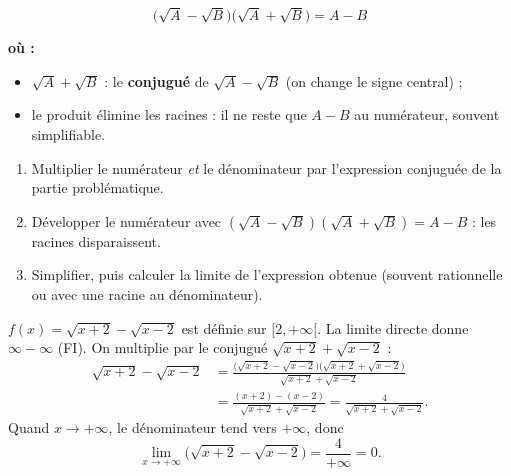 \documentclass[11pt,a4paper]{article}
\newenvironment{ou}{%
  \par\smallskip\noindent\textbf{où :}\nopagebreak
  \begin{itemize}[leftmargin=1.8em,topsep=2pt,itemsep=1.5pt,parsep=0pt]}%
  {\end{itemize}}
\begin{document}
\begin{formule}
\[ \boxed{\ \bigl(\sqrt{A}-\sqrt{B}\bigr)\bigl(\sqrt{A}+\sqrt{B}\bigr)=A-B\ } \]
\begin{ou}
  \item $\sqrt{A}+\sqrt{B}$ : le \textbf{conjugué} de $\sqrt{A}-\sqrt{B}$ (on change le signe central) ;
  \item le produit élimine les racines : il ne reste que $A-B$ au numérateur, souvent simplifiable.
\end{ou}
\end{formule}

\begin{methode}
\begin{enumerate}[leftmargin=1.9em,topsep=2pt,itemsep=2pt]
  \item Multiplier le numérateur \emph{et} le dénominateur par l'expression conjuguée de la partie problématique.
  \item Développer le numérateur avec $(\sqrt A-\sqrt B)(\sqrt A+\sqrt B)=A-B$ : les racines disparaissent.
  \item Simplifier, puis calculer la limite de l'expression obtenue (souvent rationnelle ou avec une racine au dénominateur).
\end{enumerate}
\end{methode}

\begin{exemple}
$f(x)=\sqrt{x+2}-\sqrt{x-2}$ est définie sur $[2,+\infty[$. La limite directe donne
$\infty-\infty$ (FI). On multiplie par le conjugué $\sqrt{x+2}+\sqrt{x-2}$ :
\begin{align*}
\sqrt{x+2}-\sqrt{x-2}
   &=\frac{\bigl(\sqrt{x+2}-\sqrt{x-2}\bigr)\bigl(\sqrt{x+2}+\sqrt{x-2}\bigr)}{\sqrt{x+2}+\sqrt{x-2}}\\[4pt]
   &=\frac{(x+2)-(x-2)}{\sqrt{x+2}+\sqrt{x-2}}=\frac{4}{\sqrt{x+2}+\sqrt{x-2}}.
\end{align*}
Quand $x\to+\infty$, le dénominateur tend vers $+\infty$, donc
\[ \lim_{x\to+\infty}\bigl(\sqrt{x+2}-\sqrt{x-2}\bigr)=\frac{4}{+\infty}=0. \]
\end{exemple}
\end{document}
